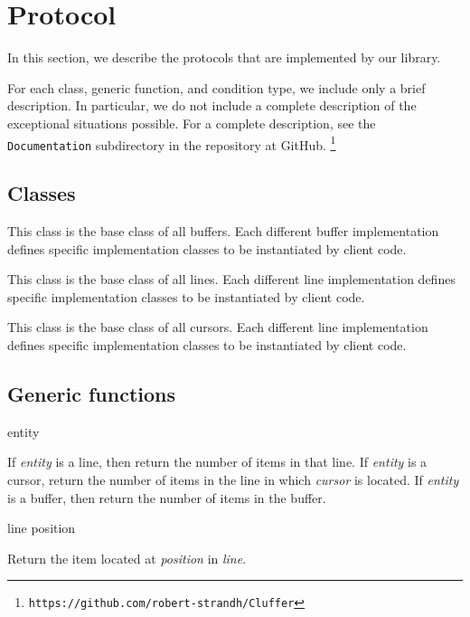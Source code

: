 \appendix

\section{Protocol}

In this section, we describe the protocols that are implemented by our
library.

For each class, generic function, and condition type, we include only
a brief description.  In particular, we do not include a complete
description of the exceptional situations possible.  For a complete
description, see the \texttt{Documentation} subdirectory in
the repository at GitHub.%
\footnote{\texttt{https://github.com/robert-strandh/Cluffer}}

\subsection{Classes}


\vskip 1mm\noindent
This class is the base class of all buffers.  Each different buffer
implementation defines specific implementation classes to be
instantiated by client code.


\vskip 1mm\noindent
This class is the base class of all lines.  Each different line
implementation defines specific implementation classes to be
instantiated by client code.


\vskip 1mm\noindent
This class is the base class of all cursors.  Each different line
implementation defines specific implementation classes to be
instantiated by client code.

\subsection{Generic functions}

 {entity}

\vskip 1mm\noindent
If \textit{entity} is a line, then return the number of items in that
line.  If \textit{entity} is a cursor, return the number of items in
the line in which \textit{cursor} is located.  If \textit{entity} is a
buffer, then return the number of items in the buffer.

 {line position}

\vskip 1mm\noindent
Return the item located at \textit{position} in \textit{line}.

